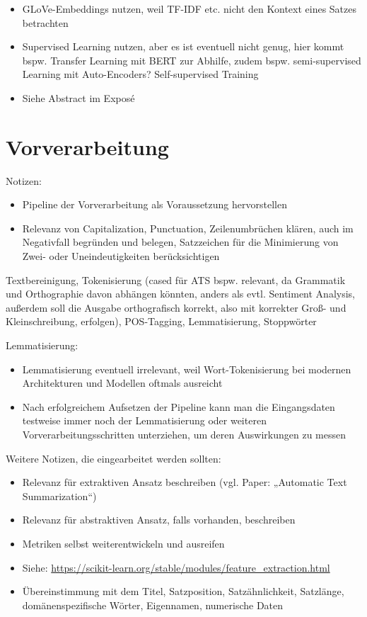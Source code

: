 \begin{itemize}
	\item GLoVe-Embeddings nutzen, weil TF-IDF etc. nicht den Kontext eines Satzes betrachten
	\item Supervised Learning nutzen, aber es ist eventuell nicht genug, hier kommt bspw. Transfer Learning mit BERT zur Abhilfe, zudem bspw. semi-supervised Learning mit Auto-Encoders? Self-supervised Training
	\item Siehe Abstract im Exposé
\end{itemize}


\section{Vorverarbeitung}
Notizen:
\begin{itemize}
	\item Pipeline der Vorverarbeitung als Voraussetzung hervorstellen
	\item Relevanz von Capitalization, Punctuation, Zeilenumbrüchen klären, auch im Negativfall begründen und belegen, Satzzeichen für die Minimierung von Zwei- oder Uneindeutigkeiten berücksichtigen
\end{itemize}


Textbereinigung, Tokenisierung (cased für ATS bspw. relevant, da Grammatik und Orthographie davon abhängen könnten, anders als evtl. Sentiment Analysis, außerdem soll die Ausgabe orthografisch korrekt, also mit korrekter Groß- und Kleinschreibung, erfolgen), POS-Tagging, Lemmatisierung, Stoppwörter

Lemmatisierung:
\begin{itemize}
	\item Lemmatisierung eventuell irrelevant, weil Wort-Tokenisierung bei modernen Architekturen und Modellen oftmals ausreicht
	\item Nach erfolgreichem Aufsetzen der Pipeline kann man die Eingangsdaten testweise immer noch der Lemmatisierung oder weiteren Vorverarbeitungsschritten unterziehen, um deren Auswirkungen zu messen
\end{itemize}

Weitere Notizen, die eingearbeitet werden sollten:
\begin{itemize}
	\item Relevanz für extraktiven Ansatz beschreiben (vgl. Paper: „Automatic Text Summarization“)
	\item Relevanz für abstraktiven Ansatz, falls vorhanden, beschreiben
	\item Metriken selbst weiterentwickeln und ausreifen
	\item Siehe: \url{https://scikit-learn.org/stable/modules/feature_extraction.html}
	\item Übereinstimmung mit dem Titel, Satzposition, Satzähnlichkeit, Satzlänge, domänenspezifische Wörter, Eigennamen, numerische Daten
\end{itemize}


